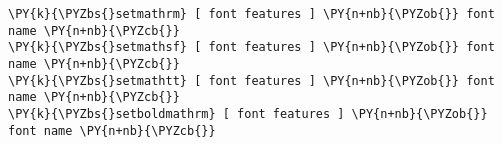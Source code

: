 \begin{Verbatim}[commandchars=\\\{\}]
\PY{k}{\PYZbs{}setmathrm} [ font features ] \PY{n+nb}{\PYZob{}} font name \PY{n+nb}{\PYZcb{}}
\PY{k}{\PYZbs{}setmathsf} [ font features ] \PY{n+nb}{\PYZob{}} font name \PY{n+nb}{\PYZcb{}}
\PY{k}{\PYZbs{}setmathtt} [ font features ] \PY{n+nb}{\PYZob{}} font name \PY{n+nb}{\PYZcb{}}
\PY{k}{\PYZbs{}setboldmathrm} [ font features ] \PY{n+nb}{\PYZob{}} font name \PY{n+nb}{\PYZcb{}}
\end{Verbatim}
